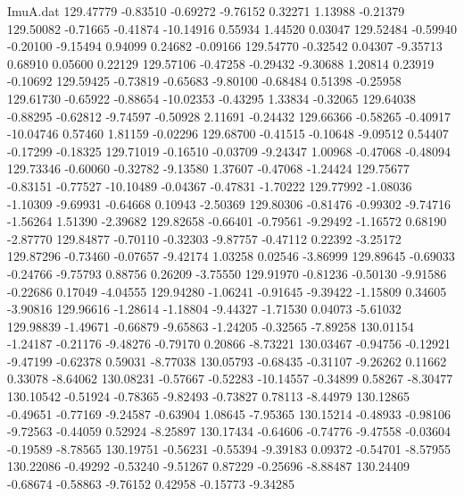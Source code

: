 \begin{filecontents}{ImuA.dat}
 129.47779   -0.83510   -0.69272   -9.76152    0.32271    1.13988   -0.21379
 129.50082   -0.71665   -0.41874  -10.14916    0.55934    1.44520    0.03047
 129.52484   -0.59940   -0.20100   -9.15494    0.94099    0.24682   -0.09166
 129.54770   -0.32542    0.04307   -9.35713    0.68910    0.05600    0.22129
 129.57106   -0.47258   -0.29432   -9.30688    1.20814    0.23919   -0.10692
 129.59425   -0.73819   -0.65683   -9.80100   -0.68484    0.51398   -0.25958
 129.61730   -0.65922   -0.88654  -10.02353   -0.43295    1.33834   -0.32065
 129.64038   -0.88295   -0.62812   -9.74597   -0.50928    2.11691   -0.24432
 129.66366   -0.58265   -0.40917  -10.04746    0.57460    1.81159   -0.02296
 129.68700   -0.41515   -0.10648   -9.09512    0.54407   -0.17299   -0.18325
 129.71019   -0.16510   -0.03709   -9.24347    1.00968   -0.47068   -0.48094
 129.73346   -0.60060   -0.32782   -9.13580    1.37607   -0.47068   -1.24424
 129.75677   -0.83151   -0.77527  -10.10489   -0.04367   -0.47831   -1.70222
 129.77992   -1.08036   -1.10309   -9.69931   -0.64668    0.10943   -2.50369
 129.80306   -0.81476   -0.99302   -9.74716   -1.56264    1.51390   -2.39682
 129.82658   -0.66401   -0.79561   -9.29492   -1.16572    0.68190   -2.87770
 129.84877   -0.70110   -0.32303   -9.87757   -0.47112    0.22392   -3.25172
 129.87296   -0.73460   -0.07657   -9.42174    1.03258    0.02546   -3.86999
 129.89645   -0.69033   -0.24766   -9.75793    0.88756    0.26209   -3.75550
 129.91970   -0.81236   -0.50130   -9.91586   -0.22686    0.17049   -4.04555
 129.94280   -1.06241   -0.91645   -9.39422   -1.15809    0.34605   -3.90816
 129.96616   -1.28614   -1.18804   -9.44327   -1.71530    0.04073   -5.61032
 129.98839   -1.49671   -0.66879   -9.65863   -1.24205   -0.32565   -7.89258
 130.01154   -1.24187   -0.21176   -9.48276   -0.79170    0.20866   -8.73221
 130.03467   -0.94756   -0.12921   -9.47199   -0.62378    0.59031   -8.77038
 130.05793   -0.68435   -0.31107   -9.26262    0.11662    0.33078   -8.64062
 130.08231   -0.57667   -0.52283  -10.14557   -0.34899    0.58267   -8.30477
 130.10542   -0.51924   -0.78365   -9.82493   -0.73827    0.78113   -8.44979
 130.12865   -0.49651   -0.77169   -9.24587   -0.63904    1.08645   -7.95365
 130.15214   -0.48933   -0.98106   -9.72563   -0.44059    0.52924   -8.25897
 130.17434   -0.64606   -0.74776   -9.47558   -0.03604   -0.19589   -8.78565
 130.19751   -0.56231   -0.55394   -9.39183    0.09372   -0.54701   -8.57955
 130.22086   -0.49292   -0.53240   -9.51267    0.87229   -0.25696   -8.88487
 130.24409   -0.68674   -0.58863   -9.76152    0.42958   -0.15773   -9.34285

\end{filecontents}
